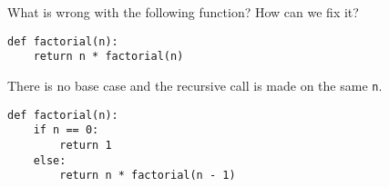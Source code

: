 \begin{blocksection}
\question What is wrong with the following function? How can we fix it?

\begin{lstlisting}
def factorial(n):
    return n * factorial(n)
\end{lstlisting}

\begin{solution}[1in]
There is no base case and the recursive call is made on the same \lstinline{n}.

\begin{lstlisting}
def factorial(n):
    if n == 0:
        return 1
    else:
        return n * factorial(n - 1)
\end{lstlisting}
\end{solution}
\end{blocksection}
